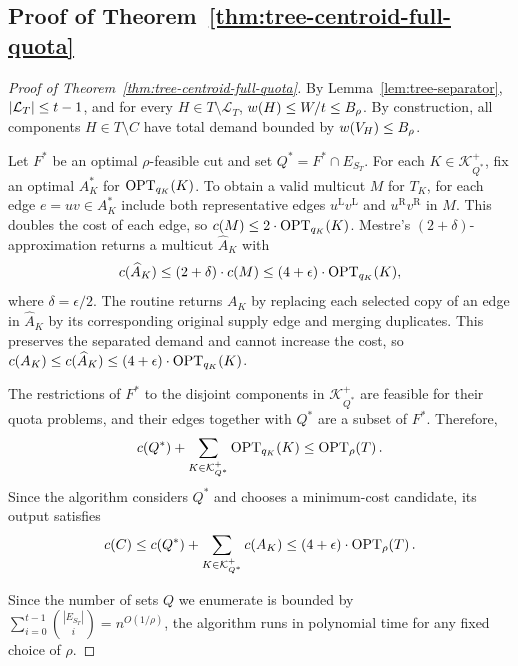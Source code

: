 \subsection{Proof of Theorem~\ref{thm:tree-centroid-full-quota}}\label{app:tree-centroid-full-quota}
\begin{proof}[Proof of Theorem~\ref{thm:tree-centroid-full-quota}]
    By Lemma~\ref{lem:tree-separator}, $\mathopen{}\left| \mathcal{L}_T \right|\leq t-1$, and for every $H\in T\setminus\mathcal L_T$, $w\mathopen{}\left( H \right)\leq W/t\leq B_\rho$. By construction, all components $H\in T\setminus C$ have total demand bounded by $w\mathopen{}\left( V_H \right)\leq B_\rho$.

    Let $F^*$ be an optimal $\rho$-feasible cut and set $Q^*=F^*\cap E_{S_T}$. For each $K\in\mathcal K_{Q^*}^+$, fix an optimal $A_K^*$ for $\textup{OPT}_{q_K}(K)$. To obtain a valid multicut $M$ for $T_K$, for each edge $e=uv\in A_K^*$ include both representative edges $u^{\mathrm L}v^{\mathrm L}$ and $u^{\mathrm R}v^{\mathrm R}$ in $M$. This doubles the cost of each edge, so $c(M)\leq2\cdot \textup{OPT}_{q_K}(K)$. Mestre's $(2+\delta)$-approximation returns a multicut $\widehat A_K$ with
    \[
        c(\widehat A_K)\leq(2+\delta)\cdot c(M)\leq(4+\epsilon)\cdot\textup{OPT}_{q_K}(K),
    \]
    where $\delta=\epsilon/2$. The routine returns $A_K$ by replacing each selected copy of an edge in $\widehat A_K$ by its corresponding original supply edge and merging duplicates. This preserves the separated demand and cannot increase the cost, so $c(A_K)\leq c(\widehat A_K)\leq(4+\epsilon)\cdot\textup{OPT}_{q_K}(K)$.

    The restrictions of $F^*$ to the disjoint components in $\mathcal K_{Q^*}^+$ are feasible for their quota problems, and their edges together with $Q^*$ are a subset of $F^*$. Therefore,
    \[
        c(Q^*)+\sum_{K\in\mathcal K_{Q^*}^+}\textup{OPT}_{q_K}(K)\leq\textup{OPT}_{\rho}\mathopen{}\left( T \right).
    \]
    Since the algorithm considers $Q^*$ and chooses a minimum-cost candidate, its output satisfies
    \[
        c(C)\leq c(Q^*)+\sum_{K\in\mathcal K_{Q^*}^+}c(A_K)
        \leq(4+\epsilon)\cdot\textup{OPT}_{\rho}\mathopen{}\left( T \right).
    \]

    Since the number of sets $Q$ we enumerate is bounded by $\sum_{i=0}^{t-1} \binom{|E_{S_T}|}{i}=n^{O(1/\rho)}$, the algorithm runs in polynomial time for any fixed choice of $\rho$.
\end{proof}
